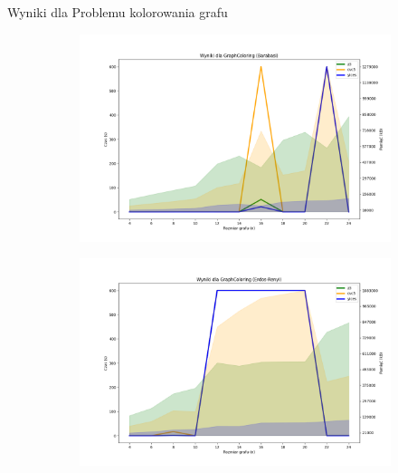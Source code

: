 \begin{frame}{Wyniki dla Problemu kolorowania grafu}
	\begin{figure}[htbp]
		\centering
		\begin{subfigure}[b]{0.5\textwidth}
			\includegraphics[width=\textwidth]{../thesis/figures/6-barabasi-plot.png}
		\end{subfigure}
		\begin{subfigure}[b]{0.49\textwidth}
			\includegraphics[width=\textwidth]{../thesis/figures/6-erdos-renyi-plot.png}
		\end{subfigure}
	\end{figure}
\end{frame}
	